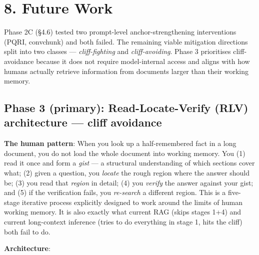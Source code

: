 \documentclass[11pt]{article}
\begin{document}
\section*{8. Future Work}


Phase 2C (§4.6) tested two prompt-level anchor-strengthening interventions (PQRI, convchunk) and both failed. The remaining viable mitigation directions split into two classes — \textit{cliff-fighting} and \textit{cliff-avoiding}. Phase 3 prioritises cliff-avoidance because it does not require model-internal access and aligns with how humans actually retrieve information from documents larger than their working memory.


\subsection*{Phase 3 (primary): Read-Locate-Verify (RLV) architecture — cliff avoidance}


\textbf{The human pattern}: When you look up a half-remembered fact in a long document, you do not load the whole document into working memory. You (1) read it once and form a \textit{gist} — a structural understanding of which sections cover what; (2) given a question, you \textit{locate} the rough region where the answer should be; (3) you read that \textit{region} in detail; (4) you \textit{verify} the answer against your gist; and (5) if the verification fails, you \textit{re-search} a different region. This is a five-stage iterative process explicitly designed to work around the limits of human working memory. It is also exactly what current RAG (skips stages 1+4) and current long-context inference (tries to do everything in stage 1, hits the cliff) both fail to do.


\textbf{Architecture}:
\end{document}
